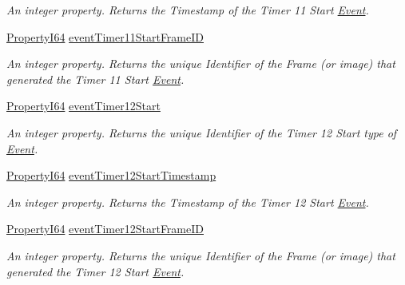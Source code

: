\begin{DoxyCompactItemize}
\begin{DoxyCompactList}\small\item\em An integer property. Returns the Timestamp of the Timer 11 Start \hyperlink{classmv_i_m_p_a_c_t_1_1acquire_1_1_event}{Event}. \end{DoxyCompactList}\item 
\hyperlink{group___common_interface_ga81749b2696755513663492664a18a893}{Property\+I64} \hyperlink{classmv_i_m_p_a_c_t_1_1acquire_1_1_gen_i_cam_1_1_event_control_a35777e569a5e1cf4a5f1af35cca9f6d6}{event\+Timer11\+Start\+Frame\+I\+D}
\begin{DoxyCompactList}\small\item\em An integer property. Returns the unique Identifier of the Frame (or image) that generated the Timer 11 Start \hyperlink{classmv_i_m_p_a_c_t_1_1acquire_1_1_event}{Event}. \end{DoxyCompactList}\item 
\hyperlink{group___common_interface_ga81749b2696755513663492664a18a893}{Property\+I64} \hyperlink{classmv_i_m_p_a_c_t_1_1acquire_1_1_gen_i_cam_1_1_event_control_a9628c8d346b0423cebd365acb6e5a27a}{event\+Timer12\+Start}
\begin{DoxyCompactList}\small\item\em An integer property. Returns the unique Identifier of the Timer 12 Start type of \hyperlink{classmv_i_m_p_a_c_t_1_1acquire_1_1_event}{Event}. \end{DoxyCompactList}\item 
\hyperlink{group___common_interface_ga81749b2696755513663492664a18a893}{Property\+I64} \hyperlink{classmv_i_m_p_a_c_t_1_1acquire_1_1_gen_i_cam_1_1_event_control_a37d2563b038e3e2873fd5890ba8b063a}{event\+Timer12\+Start\+Timestamp}
\begin{DoxyCompactList}\small\item\em An integer property. Returns the Timestamp of the Timer 12 Start \hyperlink{classmv_i_m_p_a_c_t_1_1acquire_1_1_event}{Event}. \end{DoxyCompactList}\item 
\hyperlink{group___common_interface_ga81749b2696755513663492664a18a893}{Property\+I64} \hyperlink{classmv_i_m_p_a_c_t_1_1acquire_1_1_gen_i_cam_1_1_event_control_a9b74ab79f35119709de47396fb6d09a1}{event\+Timer12\+Start\+Frame\+I\+D}
\begin{DoxyCompactList}\small\item\em An integer property. Returns the unique Identifier of the Frame (or image) that generated the Timer 12 Start \hyperlink{classmv_i_m_p_a_c_t_1_1acquire_1_1_event}{Event}. \end{DoxyCompactList}\item 

\end{DoxyCompactItemize}

